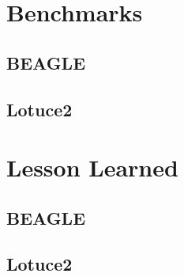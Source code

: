 \documentclass[]{spie}  %
\begin{document}
\section{Benchmarks} \label{sec:benchmarks}
\subsection{BEAGLE}
\subsection{Lotuce2}


\section{Lesson Learned} \label{sec:LL}
\subsection{BEAGLE}
\subsection{Lotuce2}

\end{document}
